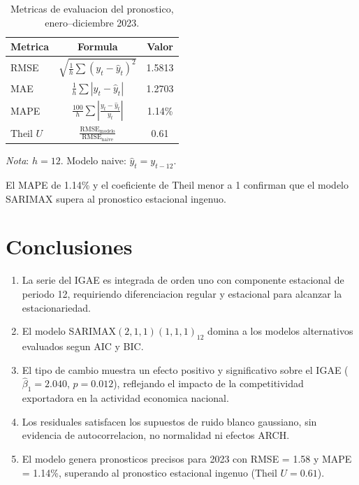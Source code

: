 \documentclass[12pt,a4paper]{article}
\begin{document}
\begin{table}[H]
  \centering
  \caption{Metricas de evaluacion del pronostico, enero--diciembre 2023.}
  \label{tab:metricas}
  \begin{tabular}{lcc}
    \toprule
    \textbf{Metrica} & \textbf{Formula} & \textbf{Valor} \\
    \midrule
    RMSE      & $\sqrt{\frac{1}{h}\sum(y_t-\hat{y}_t)^2}$                           & 1.5813 \\[5pt]
    MAE       & $\frac{1}{h}\sum|y_t-\hat{y}_t|$                                    & 1.2703 \\[5pt]
    MAPE      & $\frac{100}{h}\sum\left|\frac{y_t-\hat{y}_t}{y_t}\right|$           & 1.14\% \\[5pt]
    Theil $U$ & $\frac{\text{RMSE}_\text{modelo}}{\text{RMSE}_\text{naive}}$        &   0.61 \\
    \bottomrule
  \end{tabular}
  \begin{tablenotes}
    \small\item \textit{Nota}: $h=12$. Modelo naive: $\hat{y}_t = y_{t-12}$.
  \end{tablenotes}
\end{table}

El MAPE de 1.14\% y el coeficiente de Theil menor a 1 confirman que el modelo SARIMAX supera al pronostico estacional ingenuo.

\section{Conclusiones}

\begin{enumerate}[label=\arabic*.]
  \item La serie del IGAE es integrada de orden uno con componente estacional de periodo 12, requiriendo diferenciacion regular y estacional para alcanzar la estacionariedad.
  \item El modelo SARIMAX$(2,1,1)(1,1,1)_{12}$ domina a los modelos alternativos evaluados segun AIC y BIC.
  \item El tipo de cambio muestra un efecto positivo y significativo sobre el IGAE ($\hat{\beta}_1 = 2.040$, $p=0.012$), reflejando el impacto de la competitividad exportadora en la actividad economica nacional.
  \item Los residuales satisfacen los supuestos de ruido blanco gaussiano, sin evidencia de autocorrelacion, no normalidad ni efectos ARCH.
  \item El modelo genera pronosticos precisos para 2023 con RMSE = 1.58 y MAPE = 1.14\%, superando al pronostico estacional ingenuo (Theil $U = 0.61$).
\end{enumerate}
\end{document}
